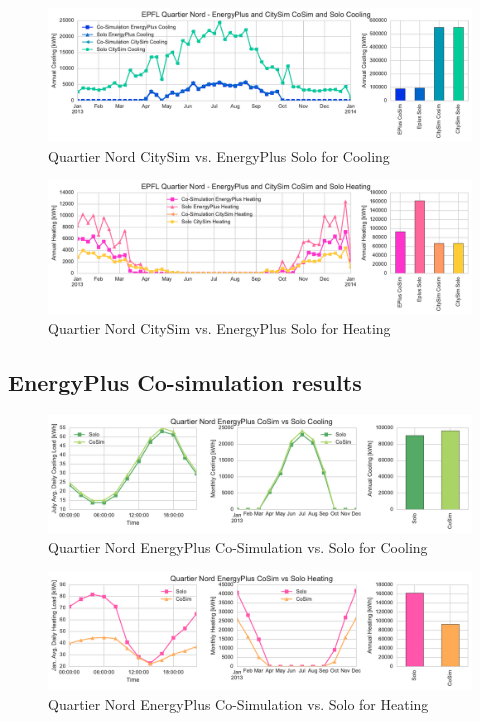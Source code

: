 \documentclass{tBPS2e}
\theoremstyle{plain}
\theoremstyle{definition}
\theoremstyle{remark}
\begin{document}
\begin{figure}[H]
\centering
\includegraphics[scale=0.55]{figures/QN_Cooling}
\caption{Quartier Nord CitySim vs. EnergyPlus Solo for Cooling}
\label{fig:qn_eplusvscitysim_cooling}
\end{figure}

\begin{figure}[H]
\centering
\includegraphics[scale=0.55]{figures/QN_Heating.pdf}
\caption{Quartier Nord CitySim vs. EnergyPlus Solo for Heating}
\label{fig:qn_eplusvscitysim_heating}
\end{figure}

\subsection{EnergyPlus Co-simulation results}

\begin{figure}[H]
\centering
\includegraphics[scale=0.55]{figures/QN_EnergyPlus_Cooling}
\caption{Quartier Nord EnergyPlus Co-Simulation vs. Solo for Cooling}
\label{fig:qn_eplus_cosimvssolo_cooling}
\end{figure}

\begin{figure}[H]
\centering
\includegraphics[scale=0.55]{figures/QN_EnergyPlus_Heating}
\caption{Quartier Nord EnergyPlus Co-Simulation vs. Solo for Heating}
\label{fig:qn_eplus_cosimvssolo_heating}
\end{figure}
\end{document}
